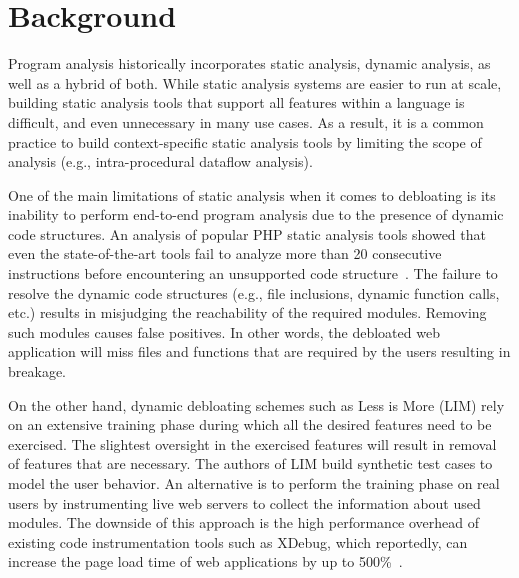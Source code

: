 \section{Background}
Program analysis historically incorporates static analysis, dynamic analysis, as well as a hybrid of both. 
While static analysis systems are easier to run at scale, building static analysis tools that support all features within a language is difficult, and even unnecessary in many use cases. 
As a result, it is a common practice to build context-specific static analysis tools by limiting the scope of analysis (e.g., intra-procedural dataflow analysis). 

One of the main limitations of static analysis when it comes to debloating is its inability to perform end-to-end program analysis due to the presence of dynamic code structures. 
An analysis of popular PHP static analysis tools showed that even the state-of-the-art tools fail to analyze more than 20 consecutive instructions before encountering an unsupported code structure~\cite{altestability}. 
The failure to resolve the dynamic code structures (e.g., file inclusions, dynamic function calls, etc.) results in misjudging the reachability of the required modules. 
Removing such modules causes false positives. 
In other words, the debloated web application will miss files and functions that are required by the users resulting in breakage. 

On the other hand, dynamic debloating schemes such as Less is More (LIM) rely on an extensive training phase during which all the desired features need to be exercised. 
The slightest oversight in the exercised features will result in removal of features that are necessary. 
The authors of LIM build synthetic test cases to model the user behavior. 
An alternative is to perform the training phase on real users by instrumenting live web servers to collect the information about used modules. 
The downside of this approach is the high performance overhead of existing code instrumentation tools such as XDebug, which reportedly, can increase the page load time of web applications by up to 500\%~\cite{azad2019less}. 

